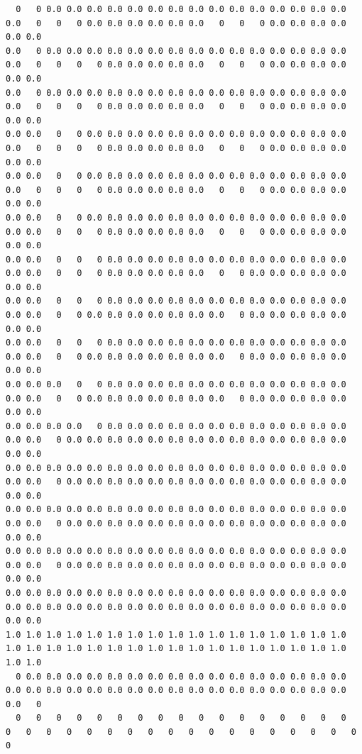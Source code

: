 \documentclass[11pt,fleqn]{book} %
\begin{document}
\begin{verbatim}
  0   0 0.0 0.0 0.0 0.0 0.0 0.0 0.0 0.0 0.0 0.0 0.0 0.0 0.0 0.0 0.0 0.0   0   0   0 0.0 0.0 0.0 0.0 0.0 0.0   0   0   0 0.0 0.0 0.0 0.0 0.0 0.0
0.0   0 0.0 0.0 0.0 0.0 0.0 0.0 0.0 0.0 0.0 0.0 0.0 0.0 0.0 0.0 0.0 0.0   0   0   0   0 0.0 0.0 0.0 0.0 0.0   0   0   0 0.0 0.0 0.0 0.0 0.0 0.0
0.0   0 0.0 0.0 0.0 0.0 0.0 0.0 0.0 0.0 0.0 0.0 0.0 0.0 0.0 0.0 0.0 0.0   0   0   0   0 0.0 0.0 0.0 0.0 0.0   0   0   0 0.0 0.0 0.0 0.0 0.0 0.0
0.0 0.0   0   0 0.0 0.0 0.0 0.0 0.0 0.0 0.0 0.0 0.0 0.0 0.0 0.0 0.0 0.0   0   0   0   0 0.0 0.0 0.0 0.0 0.0   0   0   0 0.0 0.0 0.0 0.0 0.0 0.0
0.0 0.0   0   0 0.0 0.0 0.0 0.0 0.0 0.0 0.0 0.0 0.0 0.0 0.0 0.0 0.0 0.0   0   0   0   0 0.0 0.0 0.0 0.0 0.0   0   0   0 0.0 0.0 0.0 0.0 0.0 0.0
0.0 0.0   0   0 0.0 0.0 0.0 0.0 0.0 0.0 0.0 0.0 0.0 0.0 0.0 0.0 0.0 0.0 0.0   0   0   0 0.0 0.0 0.0 0.0 0.0   0   0   0 0.0 0.0 0.0 0.0 0.0 0.0
0.0 0.0   0   0   0 0.0 0.0 0.0 0.0 0.0 0.0 0.0 0.0 0.0 0.0 0.0 0.0 0.0 0.0   0   0   0 0.0 0.0 0.0 0.0 0.0   0   0 0.0 0.0 0.0 0.0 0.0 0.0 0.0
0.0 0.0   0   0   0 0.0 0.0 0.0 0.0 0.0 0.0 0.0 0.0 0.0 0.0 0.0 0.0 0.0 0.0   0   0 0.0 0.0 0.0 0.0 0.0 0.0 0.0   0 0.0 0.0 0.0 0.0 0.0 0.0 0.0
0.0 0.0   0   0   0 0.0 0.0 0.0 0.0 0.0 0.0 0.0 0.0 0.0 0.0 0.0 0.0 0.0 0.0   0   0 0.0 0.0 0.0 0.0 0.0 0.0 0.0   0 0.0 0.0 0.0 0.0 0.0 0.0 0.0
0.0 0.0 0.0   0   0 0.0 0.0 0.0 0.0 0.0 0.0 0.0 0.0 0.0 0.0 0.0 0.0 0.0 0.0   0   0 0.0 0.0 0.0 0.0 0.0 0.0 0.0   0 0.0 0.0 0.0 0.0 0.0 0.0 0.0
0.0 0.0 0.0 0.0   0 0.0 0.0 0.0 0.0 0.0 0.0 0.0 0.0 0.0 0.0 0.0 0.0 0.0 0.0   0 0.0 0.0 0.0 0.0 0.0 0.0 0.0 0.0 0.0 0.0 0.0 0.0 0.0 0.0 0.0 0.0
0.0 0.0 0.0 0.0 0.0 0.0 0.0 0.0 0.0 0.0 0.0 0.0 0.0 0.0 0.0 0.0 0.0 0.0 0.0   0 0.0 0.0 0.0 0.0 0.0 0.0 0.0 0.0 0.0 0.0 0.0 0.0 0.0 0.0 0.0 0.0
0.0 0.0 0.0 0.0 0.0 0.0 0.0 0.0 0.0 0.0 0.0 0.0 0.0 0.0 0.0 0.0 0.0 0.0 0.0   0 0.0 0.0 0.0 0.0 0.0 0.0 0.0 0.0 0.0 0.0 0.0 0.0 0.0 0.0 0.0 0.0
0.0 0.0 0.0 0.0 0.0 0.0 0.0 0.0 0.0 0.0 0.0 0.0 0.0 0.0 0.0 0.0 0.0 0.0 0.0   0 0.0 0.0 0.0 0.0 0.0 0.0 0.0 0.0 0.0 0.0 0.0 0.0 0.0 0.0 0.0 0.0
0.0 0.0 0.0 0.0 0.0 0.0 0.0 0.0 0.0 0.0 0.0 0.0 0.0 0.0 0.0 0.0 0.0 0.0 0.0 0.0 0.0 0.0 0.0 0.0 0.0 0.0 0.0 0.0 0.0 0.0 0.0 0.0 0.0 0.0 0.0 0.0
1.0 1.0 1.0 1.0 1.0 1.0 1.0 1.0 1.0 1.0 1.0 1.0 1.0 1.0 1.0 1.0 1.0 1.0 1.0 1.0 1.0 1.0 1.0 1.0 1.0 1.0 1.0 1.0 1.0 1.0 1.0 1.0 1.0 1.0 1.0 1.0
  0 0.0 0.0 0.0 0.0 0.0 0.0 0.0 0.0 0.0 0.0 0.0 0.0 0.0 0.0 0.0 0.0 0.0 0.0 0.0 0.0 0.0 0.0 0.0 0.0 0.0 0.0 0.0 0.0 0.0 0.0 0.0 0.0 0.0 0.0   0
  0   0   0   0   0   0   0   0   0   0   0   0   0   0   0   0   0   0   0   0   0   0   0   0   0   0   0   0   0   0   0   0   0   0   0   0
\end{verbatim}\normalsize
\end{document}
